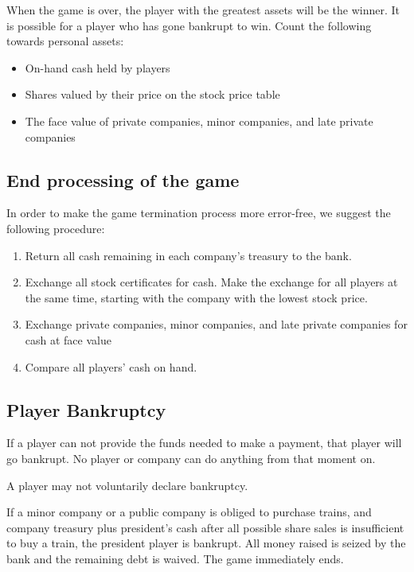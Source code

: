 \documentclass{article}
\begin{document}
\begin{CJK}{UTF8}{min}
\begin{multicols}{2}
When the game is over, the player with the greatest assets will be the
winner. It is possible for a player who has gone bankrupt to
win. Count the following towards personal assets:

\begin{itemize}
\item On-hand cash held by players
\item Shares valued by their price on the stock price table
\item The face value of private companies, minor companies, and late
  private companies
\end{itemize}

\subsection{End processing of the game}

In order to make the game termination process more error-free, we suggest
the following procedure:

\begin{enumerate}
\item Return all cash remaining in each company's treasury to the bank.
\item Exchange all stock certificates for cash. Make the exchange for
  all players at the same time, starting with the company with the
  lowest stock price.
\item Exchange private companies, minor companies, and late private companies
  for cash at face value
\item Compare all players' cash on hand.
\end{enumerate}

\subsection{Player Bankruptcy}
\label{endgame-player-bankruptcy}
If a player can not provide the funds needed to make a payment, that
player will go bankrupt. No player or company can do anything from
that moment on.

A player may not voluntarily declare bankruptcy.

If a minor company or a public company is obliged to purchase trains,
and company treasury plus president's cash after all possible share
sales is insufficient to buy a train, the president player is
bankrupt. All money raised is seized by the bank and the remaining
debt is waived. The game immediately ends.


\end{multicols}
\end{CJK}
\end{document}
